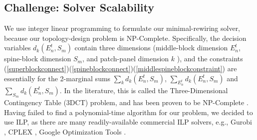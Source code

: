 \documentclass[letterpaper,twocolumn,10pt]{article}
\begin{document}

\subsection{Challenge: Solver Scalability}
We use integer linear programming to formulate our minimal-rewiring solver, because our topology-design problem is NP-Complete. Specifically, the decision variables $d_k(E_n^t,S_m)$ contain three dimensions (middle-block dimension $E_n^t$, spine-block dimension $S_m$, and patch-panel dimension $k$ ), and the constraints (\ref{superblockconnect})(\ref{spineblockconnect})(\ref{middlespineblockconstraint}) are essentially for the 2-marginal sums $\sum_k d_k(E_n^t,S_m)$, $\sum_{E_n^t} d_k(E_n^t,S_m)$ and $\sum_{S_m} d_k(E_n^t,S_m)$. In the literature, this is called the Three-Dimensional Contingency Table (3DCT) problem, and has been proven to be NP-Complete \cite{3DCT}. Having failed to find a polynomial-time algorithm for our problem, we decided to use ILP, as there are many readily-available commercial ILP solvers, e.g., Gurobi \cite{Gurobi}, {\ifpaper \else CPLEX \cite{CPLEX}, \fi} Google Optimization Tools \cite{GoogleOrTool}.

\end{document}
